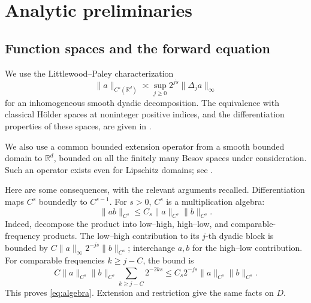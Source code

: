 \documentclass[11pt]{article}
\theoremstyle{remark}
\newcommand{\R}{\mathbb R}
\begin{document}
\section{Analytic preliminaries}

\subsection{Function spaces and the forward equation}

We use the Littlewood--Paley characterization
\begin{equation}\label{eq:LP}
\|a\|_{C^s(\R^d)}
\asymp \sup_{j\geq0}2^{js}\|\Delta_j a\|_\infty
\end{equation}
for an inhomogeneous smooth dyadic decomposition. The equivalence with
classical H\"older spaces at noninteger positive indices, and the
differentiation properties of these spaces, are given in
\cite[Chapter~13, Section~8]{Taylor}.

We also use a common bounded extension operator from a smooth bounded
domain to \(\R^d\), bounded on all the finitely many Besov spaces under
consideration. Such an operator exists even for Lipschitz domains;
see \cite{Rychkov}.

Here are some consequences, with the relevant arguments recalled.
Differentiation maps \(C^s\) boundedly to \(C^{s-1}\).
For \(s>0\), \(C^s\) is a multiplication algebra:
\begin{equation}\label{eq:algebra}
\|ab\|_{C^s}\leq C_s\|a\|_{C^s}\|b\|_{C^s}.
\end{equation}
Indeed, decompose the product into low--high, high--low, and
comparable-frequency products. The low--high contribution to its
\(j\)-th dyadic block is bounded by
\(C\|a\|_\infty 2^{-js}\|b\|_{C^s}\); interchange \(a,b\) for
the high--low contribution. For comparable frequencies \(k\geq j-C\),
the bound is
\[
C\|a\|_{C^s}\|b\|_{C^s}
\sum_{k\geq j-C}2^{-2ks}
\leq C_s2^{-js}\|a\|_{C^s}\|b\|_{C^s}.
\]
This proves \eqref{eq:algebra}. Extension and restriction give the same
facts on \(D\).
\end{document}
